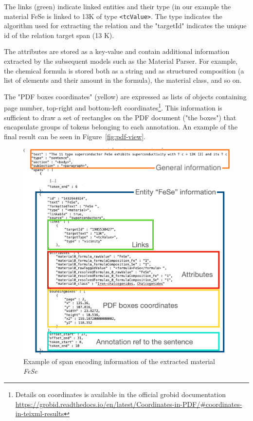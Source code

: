 \documentclass[a4paper]{article}
\begin{document}
The links (green) indicate linked entities and their type (in our example the material FeSe is linked to 13K of type \texttt{<tcValue>}. 
The type indicates the algorithm used for extracting the relation and the "targetId" indicates the unique id of the relation target span (13 K).

The attributes are stored as a key-value and contain additional information extracted by the subsequent models such as the Material Parser. For example, the chemical formula is stored both as a string and as structured composition (a list of elements and their amount in the formula), the material class, and so on.

The "PDF boxes coordinates" (yellow) are expressed as lists of objects containing page number, top-right and bottom-left coordinates\footnote{Details on coordinates is available in the official grobid documentation \url{https://grobid.readthedocs.io/en/latest/Coordinates-in-PDF/\#coordinates-in-teixml-results}}. This information is sufficient to draw a set of rectangles on the PDF document ("the boxes") that encapsulate groups of tokens belonging to each annotation. An example of the final result can be seen in Figure~\ref{fig:pdf-view}.

\begin{figure}[htbp]
  \centering
  \includegraphics[width=1\textwidth]{images/data-flow-2} 
  \caption{Example of span encoding information of the extracted material \textit{FeSe}}
  \label{fig:data-flow-2}
\end{figure}
\end{document}
